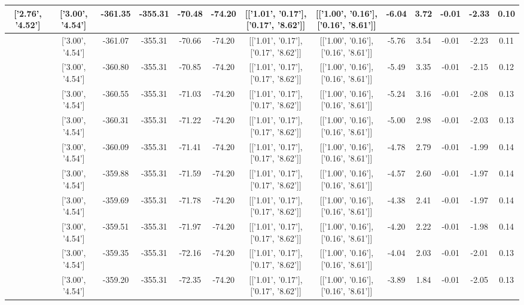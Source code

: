 \begin{table}[htbp]
\begin{adjustbox}{angle=90}
\begin{tabular}{|c|c|c|c|c|c|c|c|c|c|c|c|c|}
 ['2.76', '4.52'] & ['3.00', '4.54'] & -361.35 & -355.31 & -70.48 & -74.20 & [['1.01', '0.17'], ['0.17', '8.62']] & [['1.00', '0.16'], ['0.16', '8.61']] & -6.04 & 3.72 & -0.01 & -2.33 & 0.10\\ \hline
 ['2.78', '4.52'] & ['3.00', '4.54'] & -361.07 & -355.31 & -70.66 & -74.20 & [['1.01', '0.17'], ['0.17', '8.62']] & [['1.00', '0.16'], ['0.16', '8.61']] & -5.76 & 3.54 & -0.01 & -2.23 & 0.11\\ \hline
 ['2.79', '4.52'] & ['3.00', '4.54'] & -360.80 & -355.31 & -70.85 & -74.20 & [['1.01', '0.17'], ['0.17', '8.62']] & [['1.00', '0.16'], ['0.16', '8.61']] & -5.49 & 3.35 & -0.01 & -2.15 & 0.12\\ \hline
 ['2.80', '4.53'] & ['3.00', '4.54'] & -360.55 & -355.31 & -71.03 & -74.20 & [['1.01', '0.17'], ['0.17', '8.62']] & [['1.00', '0.16'], ['0.16', '8.61']] & -5.24 & 3.16 & -0.01 & -2.08 & 0.13\\ \hline
 ['2.81', '4.53'] & ['3.00', '4.54'] & -360.31 & -355.31 & -71.22 & -74.20 & [['1.01', '0.17'], ['0.17', '8.62']] & [['1.00', '0.16'], ['0.16', '8.61']] & -5.00 & 2.98 & -0.01 & -2.03 & 0.13\\ \hline
 ['2.82', '4.53'] & ['3.00', '4.54'] & -360.09 & -355.31 & -71.41 & -74.20 & [['1.01', '0.17'], ['0.17', '8.62']] & [['1.00', '0.16'], ['0.16', '8.61']] & -4.78 & 2.79 & -0.01 & -1.99 & 0.14\\ \hline
 ['2.84', '4.53'] & ['3.00', '4.54'] & -359.88 & -355.31 & -71.59 & -74.20 & [['1.01', '0.17'], ['0.17', '8.62']] & [['1.00', '0.16'], ['0.16', '8.61']] & -4.57 & 2.60 & -0.01 & -1.97 & 0.14\\ \hline
 ['2.85', '4.53'] & ['3.00', '4.54'] & -359.69 & -355.31 & -71.78 & -74.20 & [['1.01', '0.17'], ['0.17', '8.62']] & [['1.00', '0.16'], ['0.16', '8.61']] & -4.38 & 2.41 & -0.01 & -1.97 & 0.14\\ \hline
 ['2.86', '4.53'] & ['3.00', '4.54'] & -359.51 & -355.31 & -71.97 & -74.20 & [['1.01', '0.17'], ['0.17', '8.62']] & [['1.00', '0.16'], ['0.16', '8.61']] & -4.20 & 2.22 & -0.01 & -1.98 & 0.14\\ \hline
 ['2.87', '4.53'] & ['3.00', '4.54'] & -359.35 & -355.31 & -72.16 & -74.20 & [['1.01', '0.17'], ['0.17', '8.62']] & [['1.00', '0.16'], ['0.16', '8.61']] & -4.04 & 2.03 & -0.01 & -2.01 & 0.13\\ \hline
 ['2.88', '4.53'] & ['3.00', '4.54'] & -359.20 & -355.31 & -72.35 & -74.20 & [['1.01', '0.17'], ['0.17', '8.62']] & [['1.00', '0.16'], ['0.16', '8.61']] & -3.89 & 1.84 & -0.01 & -2.05 & 0.13\\ \hline

\end{tabular}
\end{adjustbox}
\end{table}
